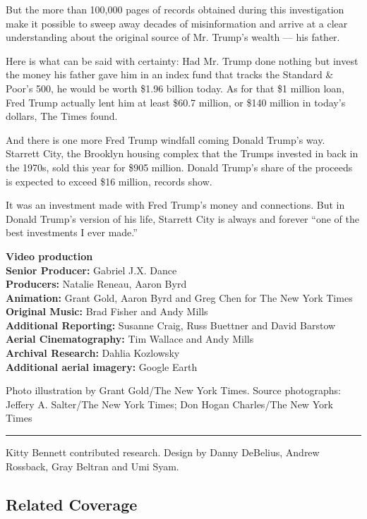 But the more than 100,000 pages of records obtained during this
investigation make it possible to sweep away decades of misinformation
and arrive at a clear understanding about the original source of Mr.
Trump's wealth --- his father.

Here is what can be said with certainty: Had Mr. Trump done nothing but
invest the money his father gave him in an index fund that tracks the
Standard \& Poor's 500, he would be worth \$1.96 billion today. As for
that \$1 million loan, Fred Trump actually lent him at least \$60.7
million, or \$140 million in today's dollars, The Times found.

And there is one more Fred Trump windfall coming Donald Trump's way.
Starrett City, the Brooklyn housing complex that the Trumps invested in
back in the 1970s, sold this year for \$905 million. Donald Trump's
share of the proceeds is expected to exceed \$16 million, records show.

It was an investment made with Fred Trump's money and connections. But
in Donald Trump's version of his life, Starrett City is always and
forever ``one of the best investments I ever made.''

\textbf{Video production\\
Senior Producer:} Gabriel J.X. Dance\\
\textbf{Producers:} Natalie Reneau, Aaron Byrd\\
\textbf{Animation:} Grant Gold, Aaron Byrd and Greg Chen for The New
York Times\\
\textbf{Original Music:} Brad Fisher and Andy Mills\\
\textbf{Additional Reporting:} Susanne Craig, Russ Buettner and David
Barstow\\
\textbf{Aerial Cinematography:} Tim Wallace and Andy Mills\\
\textbf{Archival Research:} Dahlia Kozlowsky\\
\textbf{\textbf{Additional aerial imagery}:} Google Earth

Photo illustration by Grant Gold/The New York Times. Source photographs:
Jeffery A. Salter/The New York Times; Don Hogan Charles/The New York
Times

\begin{center}\rule{0.5\linewidth}{\linethickness}\end{center}

Kitty Bennett contributed research. Design by Danny DeBelius, Andrew
Rossback, Gray Beltran and Umi Syam.

\hypertarget{related-coverage}{%
\subsection{Related Coverage}\label{related-coverage}}


